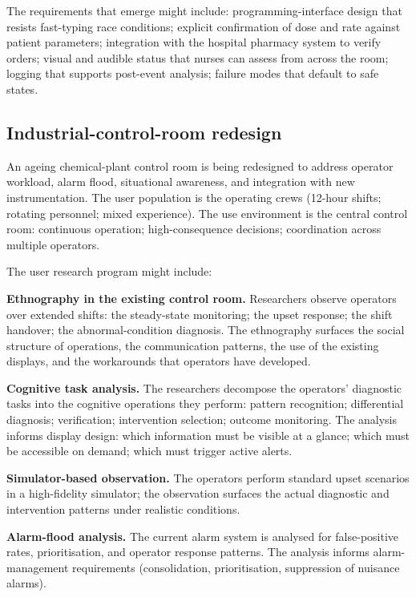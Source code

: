The requirements that emerge might include: programming-interface design that resists fast-typing race conditions; explicit confirmation of dose and rate against patient parameters; integration with the hospital pharmacy system to verify orders; visual and audible status that nurses can assess from across the room; logging that supports post-event analysis; failure modes that default to safe states.

\subsection*{Industrial-control-room redesign}

An ageing chemical-plant control room is being redesigned to address operator workload, alarm flood, situational awareness, and integration with new instrumentation. The user population is the operating crews (12-hour shifts; rotating personnel; mixed experience). The use environment is the central control room: continuous operation; high-consequence decisions; coordination across multiple operators.

The user research program might include:

\textbf{Ethnography in the existing control room.} Researchers observe operators over extended shifts: the steady-state monitoring; the upset response; the shift handover; the abnormal-condition diagnosis. The ethnography surfaces the social structure of operations, the communication patterns, the use of the existing displays, and the workarounds that operators have developed.

\textbf{Cognitive task analysis.} The researchers decompose the operators' diagnostic tasks into the cognitive operations they perform: pattern recognition; differential diagnosis; verification; intervention selection; outcome monitoring. The analysis informs display design: which information must be visible at a glance; which must be accessible on demand; which must trigger active alerts.

\textbf{Simulator-based observation.} The operators perform standard upset scenarios in a high-fidelity simulator; the observation surfaces the actual diagnostic and intervention patterns under realistic conditions.

\textbf{Alarm-flood analysis.} The current alarm system is analysed for false-positive rates, prioritisation, and operator response patterns. The analysis informs alarm-management requirements (consolidation, prioritisation, suppression of nuisance alarms).

